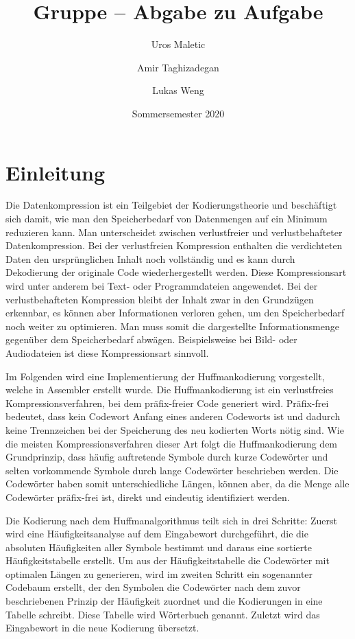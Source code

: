 \documentclass[course=erap]{aspdoc}
\author{Uros Maletic \and Amir Taghizadegan \and Lukas Weng}
\date{Sommersemester 2020} %
\title{Gruppe \theGroup{} -- Abgabe zu Aufgabe \theNumber}
\begin{document}
\maketitle

\section{Einleitung}

Die Datenkompression ist ein Teilgebiet der Kodierungstheorie und beschäftigt sich damit, wie man den Speicherbedarf von Datenmengen auf ein Minimum reduzieren kann.\cite{codierungstheorieVT}
Man unterscheidet zwischen verlustfreier und verlustbehafteter Datenkompression. Bei der verlustfreien Kompression enthalten die verdichteten Daten den ursprünglichen Inhalt noch vollständig und es kann durch Dekodierung der originale Code wiederhergestellt werden. Diese Kompressionsart wird unter anderem bei Text- oder Programmdateien angewendet.
Bei der verlustbehafteten Kompression bleibt der Inhalt zwar in den Grundzügen erkennbar, es können aber Informationen verloren gehen, um den Speicherbedarf noch weiter zu optimieren. Man muss somit die dargestellte Informationsmenge gegenüber dem Speicherbedarf abwägen. Beispielsweise bei Bild- oder Audiodateien ist diese Kompressionsart sinnvoll.\cite{grundkursCodierungSpringer}

Im Folgenden wird eine Implementierung der Huffmankodierung vorgestellt, welche in Assembler erstellt wurde. Die Huffmankodierung ist ein verlustfreies Kompressionsverfahren, bei dem präfix-freier Code generiert wird. Präfix-frei bedeutet, dass kein Codewort Anfang eines anderen Codeworts ist und dadurch keine Trennzeichen bei der Speicherung des neu kodierten Worts nötig sind.
Wie die meisten Kompressionsverfahren dieser Art folgt die Huffmankodierung dem Grundprinzip, dass häufig auftretende Symbole durch kurze Codewörter und selten vorkommende Symbole durch lange Codewörter beschrieben werden. Die Codewörter haben somit unterschiedliche Längen, können aber, da die Menge alle Codewörter präfix-frei ist, direkt und eindeutig identifiziert werden.

Die Kodierung nach dem Huffmanalgorithmus teilt sich in drei Schritte: Zuerst wird eine Häufigkeitsanalyse auf dem Eingabewort durchgeführt, die die absoluten Häufigkeiten aller Symbole bestimmt und daraus eine sortierte Häufigkeitstabelle erstellt. Um aus der Häufigkeitstabelle die Codewörter mit optimalen Längen zu generieren, wird im zweiten Schritt ein sogenannter Codebaum erstellt, der den Symbolen die Codewörter nach dem zuvor beschriebenen Prinzip der Häufigkeit zuordnet und die Kodierungen in eine Tabelle schreibt. Diese Tabelle wird Wörterbuch genannt. Zuletzt wird das Eingabewort in die neue Kodierung übersetzt.\cite{codierungUndKryptologieSpringer}
\end{document}
